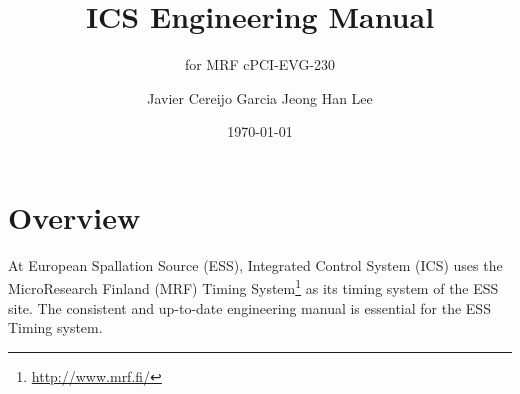 \documentclass[11pt
  , a4paper
  , article
  , oneside
  , showtrims
]{memoir}
\begin{document}
%

%

%
\date{\today}

%

%

%

%
\title{ICS Engineering Manual}
\subtitle{for MRF cPCI-EVG-230}
\author{Javier Cereijo Garcia \newline Jeong Han Lee}





\showtrimson

\esstitle
\newpage
\tableofcontents
\newpage



\chapter{Overview}
At European Spallation Source (ESS), Integrated Control System (ICS) uses the MicroResearch Finland (MRF) Timing System{\footnote{\url{http://www.mrf.fi/}}} as its timing system of the ESS site. The consistent and up-to-date engineering manual is essential for the ESS Timing system.
\end{document}
